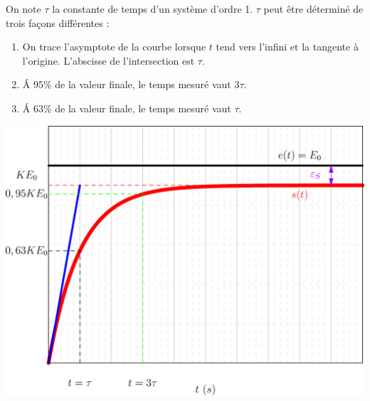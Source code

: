 \documentclass[11pt,oneside]{article}
\begin{document}
{\noindent\begin{minipage}[c]{.47\linewidth}
\begin{methode}
On note $\tau$ la constante de temps d'un système d'ordre 1. $\tau$ peut être déterminé de trois façons différentes :
\begin{enumerate}
\item On trace l'asymptote de la courbe lorsque $t$ tend vers l'infini et la tangente à l'origine. L'abscisse de l'intersection est $\tau$.
\item \'A 95\% de la valeur finale, le temps mesuré vaut 3$\tau$.
\item \'A 63\% de la valeur finale, le temps mesuré vaut $\tau$.
\end{enumerate}
\end{methode}
\end{minipage}\hfill
\begin{minipage}[c]{.47\linewidth}
\begin{center}
\includegraphics[width=\textwidth]{png/ordre1_echelon.png}
\end{center}
\end{minipage}
}
\end{document}
